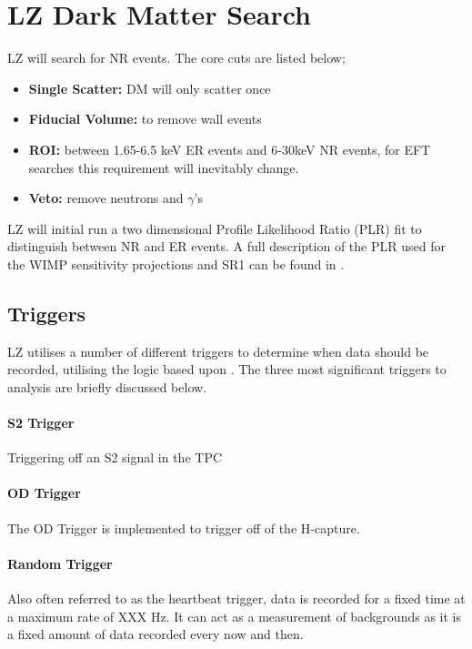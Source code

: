 \section{LZ Dark Matter Search}
\par
LZ will search for NR events.
The core cuts are listed below;
\begin{itemize}
    \item \textbf{Single Scatter:} DM will only scatter once
    \item \textbf{Fiducial Volume:} to remove wall events
    \item \textbf{ROI:} between 1.65-6.5 keV ER events and 6-30keV NR events, for EFT searches this requirement will inevitably change.
    \item \textbf{Veto:} remove neutrons and $\gamma$'s 
\end{itemize}

\par
LZ will initial run a two dimensional Profile Likelihood Ratio (PLR) fit to distinguish between NR and ER events.
A full description of the PLR used for the WIMP sensitivity projections and SR1 can be found in \cite{LZ_Ibles_LZStats_Thesis_ref}. 




\subsection{Triggers}
\par
LZ utilises a number of different triggers to determine when data should be recorded, utilising the logic based upon \cite{lux_trigger_logic_ref}.
The three most significant triggers to analysis are briefly discussed below.


\paragraph{S2 Trigger}
\par
Triggering off an S2 signal in the TPC

\paragraph{OD Trigger}
\par
The OD Trigger is implemented to trigger off of the H-capture.


\paragraph{Random Trigger}
Also often referred to as the heartbeat trigger, data is recorded for a fixed time at a maximum rate of XXX Hz.
It can act as a measurement of backgrounds as it is a fixed amount of data recorded every now and then.


